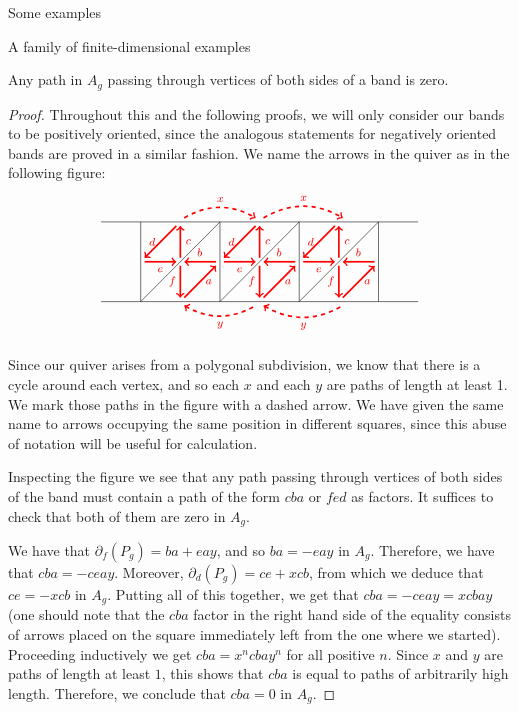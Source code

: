 \begin{chapter}{Some examples}
\begin{section}{A family of finite-dimensional examples}
\begin{lemma}\label{band-sides} Any path in $A_g$ passing through vertices of both sides of a band is zero.
\end{lemma}
\begin{proof} Throughout this and the following proofs, we will only consider our bands to be positively oriented, since the analogous statements for negatively oriented bands are proved in a similar fashion. We name the arrows in the quiver as in the following figure:
\[
\begin{tikzpicture}[text width=1.5mm, font=\footnotesize]
\draw (-4, 0) -- (4, 0);
\draw (-4, 2) -- (4, 2);
\foreach \x in {-3,-1,...,3}
\draw (\x, 0) -- (\x, 2);
\foreach \x in {-3,-1,1}
{
\draw (\x,0) -- (\x+2, 2);
\draw [->, red, very thick] (\x+1.9, 1) to node[above] {$b$} (\x+1.1, 1);
\draw[->, red, very thick] (\x+1, 0.9) to node[left]{$f$} (\x+1, 0.1);
\draw[->, red, very thick] (\x+1.1, 0.1) to node[right]{$a$} (\x+1.9, 0.9);
\draw[->, red, very thick] (\x+1, 1.1) to node[right]{$c$} (\x+1, 1.9);
\draw[->, red, very thick] (\x+0.9, 1.9) to node[left]{$d$} (\x+0.1, 1.1);
\draw[->, red, very thick] (\x+0.1, 1) to node[below]{$e$} (\x+0.9, 1);
}

\draw[->, red, dashed, very thick] (-1.9, 2.1) to [bend left] node[above]{$x$} (-0.1, 2.1);
\draw[->, red, dashed, very thick] (0.1, 2.1) to [bend left] node[above]{$x$} (2.1, 2.1);
\draw[<-, red, dashed, very thick] (-1.9, -0.1) to [bend right] node[below]{$y$} (-0.1, -0.1);
\draw[<-, red, dashed, very thick] (0.1, -0.1) to [bend right] node[below]{$y$} (2.1, -0.1);
\end{tikzpicture}
\]

Since our quiver arises from a polygonal subdivision, we know that there is a cycle around each vertex, and so each $x$ and each $y$ are paths of length at least 1. We mark those paths in the figure with a dashed arrow. We have given the same name to arrows occupying the same position in different squares, since this abuse of notation will be useful for calculation.

Inspecting the figure we see that any path passing through vertices of both sides of the band must contain a path of the form $cba$ or $fed$ as factors. It suffices to check that both of them are zero in $A_g$.

We have that $\partial_f(P_g) = ba + eay$, and so $ba  = -eay$ in $A_g$. Therefore, we have that $cba = -ceay$. Moreover, $\partial_d(P_g) = ce + xcb$, from which we deduce that $ce = -xcb$ in $A_g$. Putting all of this together, we get that $cba=-ceay=xcbay$ (one should note that the $cba$ factor in the right hand side of the equality consists of arrows placed on the square immediately left from the one where we started). Proceeding inductively we get $cba=x^ncbay^n$ for all positive $n$. Since $x$ and $y$ are paths of length at least $1$, this shows that $cba$ is equal to paths of arbitrarily high length. Therefore, we conclude that $cba=0$ in $A_g$. 


\end{proof}
\end{section}
\end{chapter}
